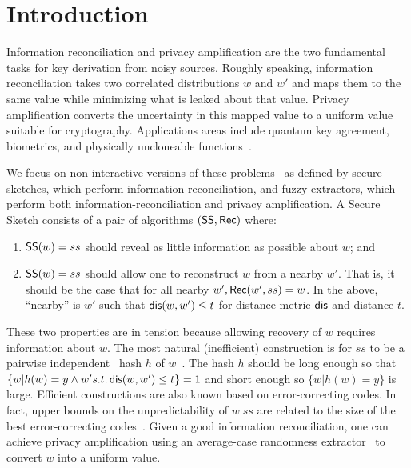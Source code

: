 
\section{Introduction}
Information reconciliation and privacy amplification are the two
fundamental tasks for key derivation from noisy sources.  Roughly
speaking, information reconciliation takes two correlated
distributions $w$ and $w'$ and maps them to the same value while
minimizing what is leaked about that value.  Privacy amplification
converts the uncertainty in this mapped value to a uniform value
suitable for cryptography.  Applications areas include quantum key
agreement, biometrics, and physically uncloneable
functions~\cite{bennett1988privacy,dodis2008fuzzy}.

We focus on non-interactive versions of these problems~\cite{dodis2008fuzzy} as defined by secure sketches, which perform information-recon\-ciliation, and fuzzy extractors, which perform both information-recon\-ciliation and privacy amplification. A Secure Sketch consists of a pair of algorithms $({\mathsf{SS}}, {\mathsf{Rec}})$ where:
\begin{enumerate}
\item ${\mathsf{SS}}(w) = ss$ should reveal as little information as possible about $w$; and
\item ${\mathsf{SS}}(w) =ss$ should allow one to reconstruct $w$ from a nearby $w'$. That is, it should be the case that for all nearby $w', {\mathsf{Rec}}(w', ss) = w$.  In the above, ``nearby'' is $w'$ such that $\mathsf{dis}(w,w')\le t$ for  distance metric $\mathsf{dis}$ and distance $t$.
\end{enumerate}
These two properties are in tension because allowing recovery of $w$ requires information about $w$.  The most natural (inefficient) construction is for $ss$ to be a pairwise independent~\cite{carter1977universal} hash $h$ of $w$~\cite{skoric2009efficient,fuller2016fuzzy,woodage2017new,fuller2020fuzzy}. The hash $h$ should be long enough so that $\{w | h(w) = y \wedge w' s.t.\,\mathsf{dis}(w, w')\le t\} =1$ and short enough so $\{w| h(w) = y\}$ is large. Efficient constructions are also known based on error-correcting codes.  In fact, upper bounds on the unpredictability of $w | ss$ are related to the size of the best error-correcting codes~\cite{dodis2008fuzzy,fuller2020computational}. 
Given a good information reconciliation, one can achieve privacy amplification using an average-case randomness extractor~\cite{nisan1993randomness} to convert $w$ into a uniform value.

